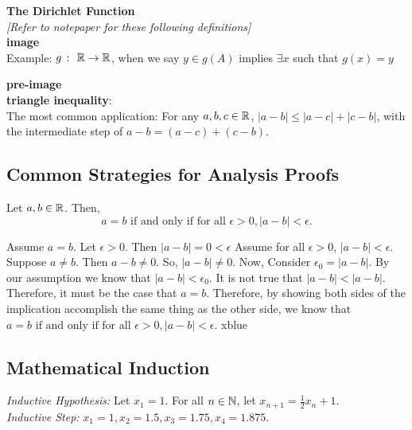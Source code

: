 \textbf{\Gls{The Dirichlet Function}} \\

\textit{[Refer to notepaper for these following definitions]} \\

\textbf{\Gls{image}} \\

Example: $g \ \colon \ \mathbb{R} \rightarrow \mathbb{R}$, when we say $y \in g(A)$ implies $\exists x$ such that $g(x) = y$

\textbf{\Gls{pre-image}} \\

\textbf{\Gls{triangle inequality}}: \\
The most common application: For any $a,b,c \in \mathbb{R}$, $|a - b| \leq |a-c| + |c-b|$, with the intermediate step of $a - b = (a-c) + (c-b)$.

\subsection{Common Strategies for Analysis Proofs} \hfill

\setcounter{BoxCounter}{5}
\begin{theorem}
    Let $a,b \in \mathbb{R}$. Then, $$a = b \text{ if and only if for all } \epsilon > 0, |a-b| < \epsilon.$$
\end{theorem}

\iffpf
    {Assume $a = b$. Let $\epsilon > 0$. Then $|a-b| = 0 < \epsilon$}
    {Assume for all $\epsilon > 0$, $|a-b| < \epsilon$. Suppose $a \ne b$. Then $a - b \ne 0$. So, $|a-b| \ne 0$. Now, Consider $\epsilon_0 = |a-b|$. By our assumption we know that $|a-b| < \epsilon_0$. It is not true that $|a-b| < |a - b|$. Therefore, it must be the case that $a = b$.}
    {Therefore, by showing both sides of the implication accomplish the same thing as the other side, we know that $a = b \text{ if and only if for all } \epsilon > 0, |a-b| < \epsilon.$}
    {xblue}

\subsection{Mathematical Induction} \hfill

\textit{Inductive Hypothesis:} Let $x_1 = 1$. For all $n \in \mathbb{N}$, let $x_{n+1} = \frac{1}{2}x_n + 1$. \\

\textit{Inductive Step:} $x_1 = 1, x_2 = 1.5, x_3 = 1.75, x_4 = 1.875$. \\

